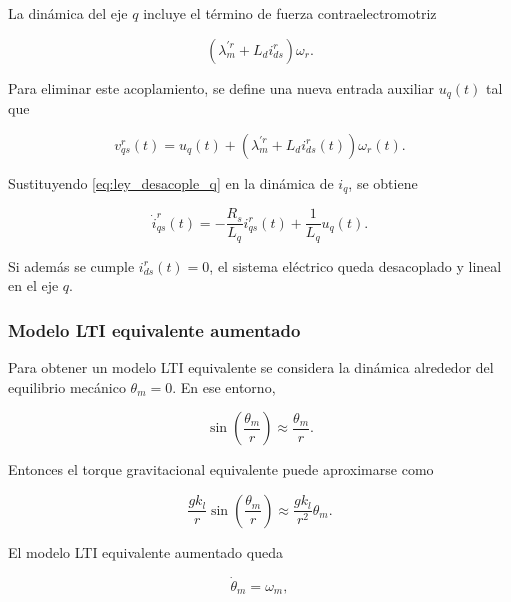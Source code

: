 \documentclass[10pt,a4paper]{article}
\begin{document}
La dinámica del eje \(q\) incluye el término de fuerza contraelectromotriz

\begin{equation}
    \left(\lambda_m^{\prime r}+L_d i_{ds}^{r}\right)\omega_r.
\end{equation}

Para eliminar este acoplamiento, se define una nueva entrada auxiliar \(u_q(t)\) tal que

\begin{equation}
    \boxed{
    v_{qs}^{r}(t)
    =
    u_q(t)
    +
    \left(\lambda_m^{\prime r}+L_d i_{ds}^{r}(t)\right)\omega_r(t)
    }.
    \label{eq:ley_desacople_q}
\end{equation}

Sustituyendo \eqref{eq:ley_desacople_q} en la dinámica de \(i_q\), se obtiene

\begin{equation}
    \dot{i}_{qs}^{r}(t)
    =
    -\frac{R_s}{L_q}i_{qs}^{r}(t)
    +
    \frac{1}{L_q}u_q(t).
    \label{eq:iq_desacoplada}
\end{equation}

Si además se cumple \(i_{ds}^{r}(t)=0\), el sistema eléctrico queda desacoplado y lineal en el eje \(q\).

\subsubsection{Modelo LTI equivalente aumentado}

Para obtener un modelo LTI equivalente se considera la dinámica alrededor del equilibrio mecánico \(\theta_m=0\). En ese entorno,

\begin{equation}
    \sin\left(\frac{\theta_m}{r}\right)
    \approx
    \frac{\theta_m}{r}.
    \label{eq:aprox_seno}
\end{equation}

Entonces el torque gravitacional equivalente puede aproximarse como

\begin{equation}
    \frac{gk_l}{r}\sin\left(\frac{\theta_m}{r}\right)
    \approx
    \frac{gk_l}{r^2}\theta_m.
    \label{eq:torque_gravitacional_lti}
\end{equation}

El modelo LTI equivalente aumentado queda

\begin{equation}
    \dot{\theta}_m=\omega_m,
    \label{eq:lti_theta_dot}
\end{equation}
\end{document}
